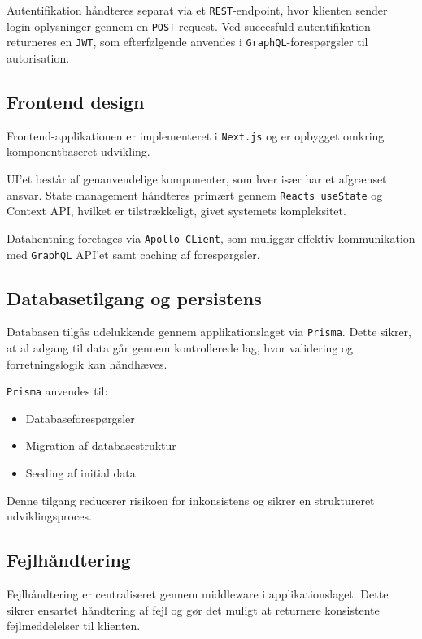 Autentifikation håndteres separat via et \texttt{REST}-endpoint, hvor klienten sender login-oplysninger
gennem en \texttt{POST}-request.
Ved succesfuld autentifikation returneres en \texttt{JWT}, som efterfølgende anvendes i \texttt{GraphQL}-forespørgsler
til autorisation.

\subsection{Frontend design}

Frontend-applikationen er implementeret i \texttt{Next.js} og er opbygget omkring komponentbaseret udvikling.

UI'et består af genanvendelige komponenter, som hver især har et afgrænset ansvar.
State management håndteres primært gennem \texttt{Reacts useState} og Context API, hvilket er tilstrækkeligt,
givet systemets kompleksitet.

Datahentning foretages via \texttt{Apollo CLient}, som muliggør effektiv kommunikation med \texttt{GraphQL} API'et
samt caching af forespørgsler.

\subsection{Databasetilgang og persistens}

Databasen tilgås udelukkende gennem applikationslaget via \texttt{Prisma}.
Dette sikrer, at al adgang til data går gennem kontrollerede lag, hvor validering og forretningslogik
kan håndhæves.

\texttt{Prisma} anvendes til:
\begin{itemize}
    \item Databaseforespørgsler
    \item Migration af databasestruktur
    \item Seeding af initial data
\end{itemize}

Denne tilgang reducerer risikoen for inkonsistens og sikrer en struktureret udviklingsproces.

\subsection{Fejlhåndtering}

Fejlhåndtering er centraliseret gennem middleware i applikationslaget.
Dette sikrer ensartet håndtering af fejl og gør det muligt at returnere konsistente fejlmeddelelser
til klienten.

